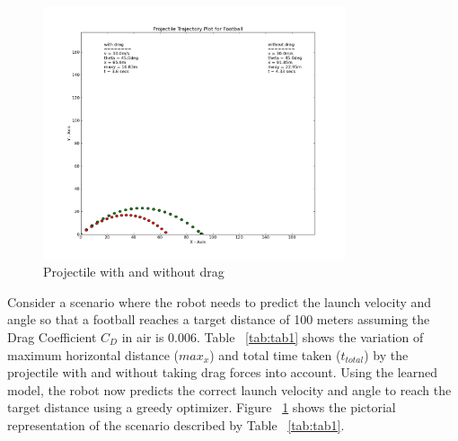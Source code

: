 \documentclass[conference]{IEEEtran}
\begin{document}
\begin{figure}[!t]
\centering
\includegraphics[width=3.5in]{fig1}
\caption{Projectile with and without drag}
\label{fig:fig1}
\end{figure}

Consider a scenario where the robot needs to predict the launch velocity and angle so that a football reaches a target distance of 100 meters assuming the Drag Coefficient $C_{D}$ in air is 0.006.  Table ~\ref{tab:tab1} shows the variation of maximum horizontal distance ($max_{x}$) and total time taken ($t_{total}$) by the projectile with and without taking drag forces into account. Using the learned model, the robot now predicts the correct launch velocity and angle to reach the target distance using a greedy optimizer. Figure ~\ref{fig:fig1} shows the pictorial representation of the scenario described by Table ~\ref{tab:tab1}.  



%
%
\end{document}
